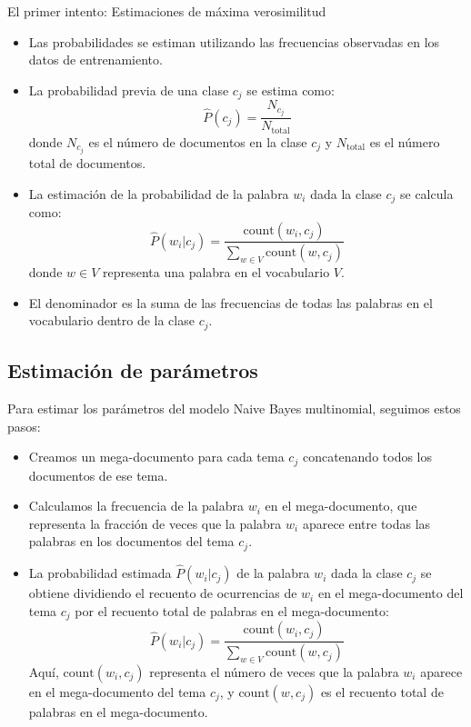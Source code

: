 \documentclass[11pt,fleqn]{book} %
\begin{document}
El primer intento: Estimaciones de máxima verosimilitud
\begin{itemize}
    \item Las probabilidades se estiman utilizando las frecuencias observadas en los datos de entrenamiento.
    \item La probabilidad previa de una clase $c_j$ se estima como:
    \[
    \hat{P}(c_j) = \frac{N_{c_j}}{N_{\text{total}}}
    \]
    donde $N_{c_j}$ es el número de documentos en la clase $c_j$ y $N_{\text{total}}$ es el número total de documentos.
    \item La estimación de la probabilidad de la palabra $w_i$ dada la clase $c_j$ se calcula como:
    \[
    \hat{P}(w_i | c_j) = \frac{{\text{count}(w_i, c_j)}}{\sum_{w\in V}{\text{count}(w, c_j)}}
    \]
    donde $w \in V$ representa una palabra en el vocabulario $V$.
    \item El denominador es la suma de las frecuencias de todas las palabras en el vocabulario dentro de la clase $c_j$.
\end{itemize}

\subsection{Estimación de parámetros}

Para estimar los parámetros del modelo Naive Bayes multinomial, seguimos estos pasos:

\begin{itemize}
  \item Creamos un mega-documento para cada tema $c_j$ concatenando todos los documentos de ese tema.
  \item Calculamos la frecuencia de la palabra $w_i$ en el mega-documento, que representa la fracción de veces que la palabra $w_i$ aparece entre todas las palabras en los documentos del tema $c_j$.
  \item La probabilidad estimada $\hat{P}(w_i | c_j)$ de la palabra $w_i$ dada la clase $c_j$ se obtiene dividiendo el recuento de ocurrencias de $w_i$ en el mega-documento del tema $c_j$ por el recuento total de palabras en el mega-documento:
  \[
  \hat{P}(w_i | c_j) = \frac{{\text{count}(w_i, c_j)}}{\sum_{w\in V}{\text{count}(w, c_j)}}
  \]
  Aquí, $\text{count}(w_i, c_j)$ representa el número de veces que la palabra $w_i$ aparece en el mega-documento del tema $c_j$, y $\text{count}(w, c_j)$ es el recuento total de palabras en el mega-documento.
\end{itemize}
\end{document}

